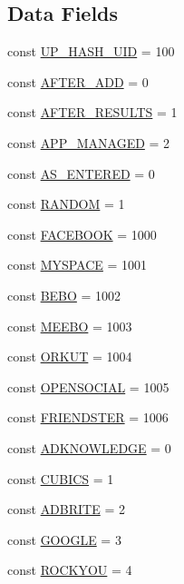 \subsection*{Data Fields}
\begin{DoxyCompactItemize}
\item 
const \hyperlink{classSnowFrame_a971fec4a94c055f1e9cfbb6108b186a8}{UP\_\-HASH\_\-UID} = 100
\item 
const \hyperlink{classSnowFrame_afdd7a2f6cda2469a1cc142c7ff18fadf}{AFTER\_\-ADD} = 0
\item 
const \hyperlink{classSnowFrame_a9502f339ccc1ac8f8338f324bd4dafb5}{AFTER\_\-RESULTS} = 1
\item 
const \hyperlink{classSnowFrame_ae1282c36cbc89a1a31d08ca4cc399c6d}{APP\_\-MANAGED} = 2
\item 
const \hyperlink{classSnowFrame_a57e74402ee3bb86f14263a0240e9fe4e}{AS\_\-ENTERED} = 0
\item 
const \hyperlink{classSnowFrame_a3523601f2c214e9f7884b6bb36b32f71}{RANDOM} = 1
\item 
const \hyperlink{classSnowFrame_a4d941b34615abdaa9658f44d6db72f02}{FACEBOOK} = 1000
\item 
const \hyperlink{classSnowFrame_ae4601c5f1be26cd79d25df82df02e8c2}{MYSPACE} = 1001
\item 
const \hyperlink{classSnowFrame_a0853456a2889234ea148756b1767a233}{BEBO} = 1002
\item 
const \hyperlink{classSnowFrame_ad2ca6d4cc2e4ffb4816e12a42fa6dd09}{MEEBO} = 1003
\item 
const \hyperlink{classSnowFrame_a2ac6d804f47c522b54bbbc9f87b592f6}{ORKUT} = 1004
\item 
const \hyperlink{classSnowFrame_aa5486bf01847fc1852eedc71d91c6bc4}{OPENSOCIAL} = 1005
\item 
const \hyperlink{classSnowFrame_a90f6b4c4363ec09c24dddfaacaab6271}{FRIENDSTER} = 1006
\item 
const \hyperlink{classSnowFrame_a8f27b2443a3d8e68b4fc0a6fb0c97867}{ADKNOWLEDGE} = 0
\item 
const \hyperlink{classSnowFrame_a8b1943afc6a89b00245090e33dbcd2d4}{CUBICS} = 1
\item 
const \hyperlink{classSnowFrame_a0cd22078135ae883abf2a66b3a2e060f}{ADBRITE} = 2
\item 
const \hyperlink{classSnowFrame_a2f6a9b703607a1705f94a8eb7027acbe}{GOOGLE} = 3
\item 
const \hyperlink{classSnowFrame_a4ed35a44107812ce45a57503b872b0ba}{ROCKYOU} = 4

\end{DoxyCompactItemize}
